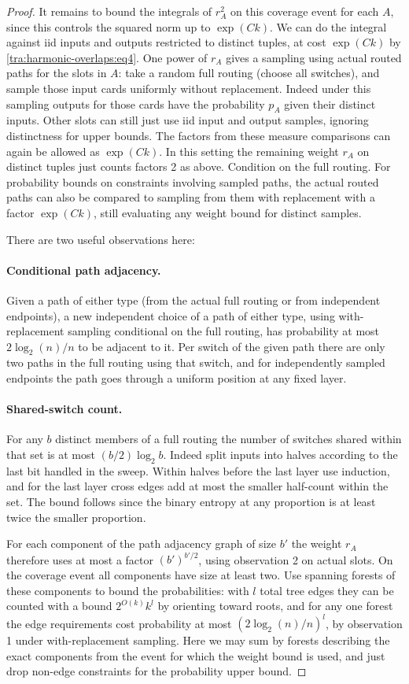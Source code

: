 \begin{proof}
It remains to bound the integrals of \(r_A^2\) on this coverage event for each \(A\), since this controls the squared norm up to \(\exp(Ck)\). We can do the integral against iid inputs and outputs restricted to distinct tuples, at cost \(\exp(Ck)\) by \eqref{tra:harmonic-overlaps:eq4}. One power of \(r_A\) gives a sampling using actual routed paths for the slots in \(A\): take a random full routing (choose all switches), and sample those input cards uniformly without replacement. Indeed under this sampling outputs for those cards have the probability \(p_A\) given their distinct inputs. Other slots can still just use iid input and output samples, ignoring distinctness for upper bounds. The factors from these measure comparisons can again be allowed as \(\exp(Ck)\). In this setting the remaining weight \(r_A\) on distinct tuples just counts factors 2 as above. Condition on the full routing. For probability bounds on constraints involving sampled paths, the actual routed paths can also be compared to sampling from them with replacement with a factor \(\exp(Ck)\), still evaluating any weight bound for distinct samples.

There are two useful observations here:
\paragraph{Conditional path adjacency.} Given a path of either type (from the actual full routing or from independent endpoints), a new independent choice of a path of either type, using with-replacement sampling conditional on the full routing, has probability at most \(2\log_2(n)/n\) to be adjacent to it. Per switch of the given path there are only two paths in the full routing using that switch, and for independently sampled endpoints the path goes through a uniform position at any fixed layer.
\paragraph{Shared-switch count.} For any \(b\) distinct members of a full routing the number of switches shared within that set is at most \((b/2)\log_2 b\). Indeed split inputs into halves according to the last bit handled in the sweep. Within halves before the last layer use induction, and for the last layer cross edges add at most the smaller half-count within the set. The bound follows since the binary entropy at any proportion is at least twice the smaller proportion.

For each component of the path adjacency graph of size \(b'\) the weight \(r_A\) therefore uses at most a factor \((b')^{b'/2}\), using observation 2 on actual slots. On the coverage event all components have size at least two. Use spanning forests of these components to bound the probabilities: with \(l\) total tree edges they can be counted with a bound \(2^{O(k)} k^l\) by orienting toward roots, and for any one forest the edge requirements cost probability at most \((2\log_2(n)/n)^l\), by observation 1 under with-replacement sampling. Here we may sum by forests describing the exact components from the event for which the weight bound is used, and just drop non-edge constraints for the probability upper bound.


\end{proof}
